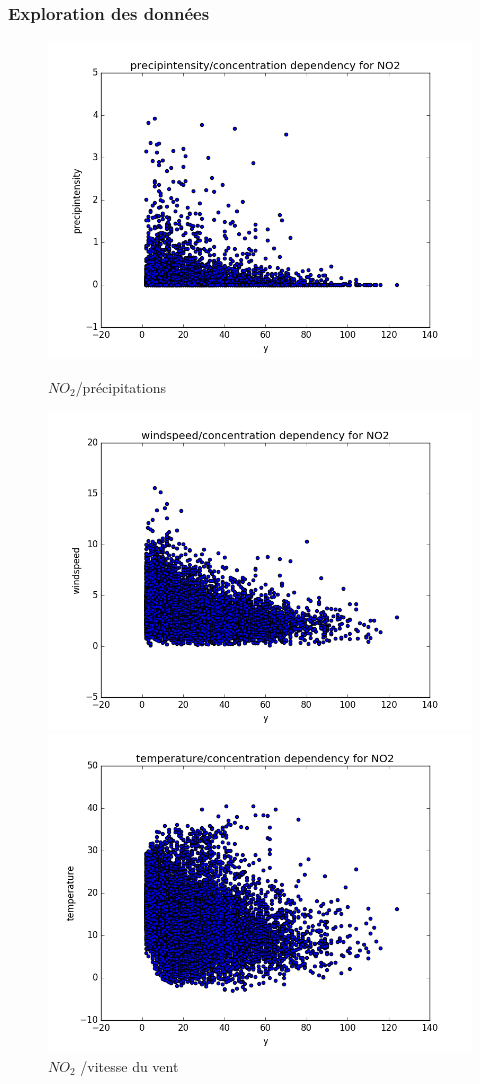 \documentclass{beamer}
\begin{document}
\begin{frame}
  \frametitle{Exploration des données}
\begin{figure}[H]
	\captionsetup{labelformat=empty}
	\includegraphics[width=\linewidth]{images/NO2_precip_y.png}
  \caption{$NO_2$/précipitations}
	\endminipage\hfill
	\includegraphics[width=\linewidth]{images/NO2_windspeed_y.png}
  \caption{$NO_2$ /vitesse du vent}
	\endminipage\hfill
	\includegraphics[width=\linewidth]{images/NO2_temp_y.png}

\end{figure}
\end{frame}
\end{document}
